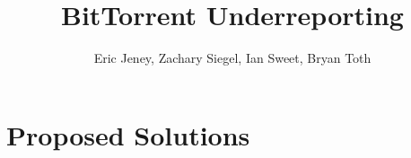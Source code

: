 \documentclass[twocolumn,11pt]{article}
\title{BitTorrent Underreporting}
\author{Eric Jeney, Zachary Siegel, Ian Sweet, Bryan Toth} %
\date{}
\begin{document}
\maketitle




\section{Proposed Solutions}






\end{document}
